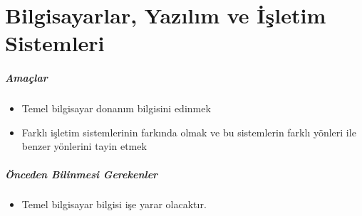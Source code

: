 \chapter{Bilgisayarlar, Yazılım ve İşletim Sistemleri}
\label{chap:bolum1}
\paragraph{Amaçlar}
\begin{itemize}
 \item Temel bilgisayar donanım bilgisini edinmek
 \item Farklı işletim sistemlerinin farkında olmak ve bu sistemlerin farklı yönleri ile benzer yönlerini tayin etmek
 \end{itemize}
 
\paragraph{Önceden Bilinmesi Gerekenler}
\begin{itemize}
 \item Temel bilgisayar bilgisi işe yarar olacaktır.
 \end{itemize}


